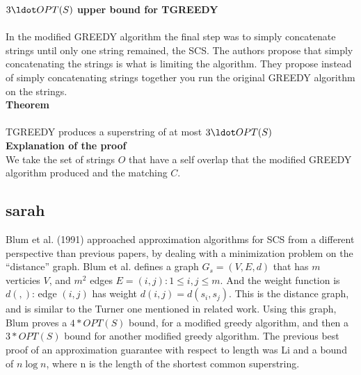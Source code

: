 \documentclass[letterpaper,11pt,titlepage]{article}
\begin{document}
\textbf{$3 \ldot OPT(S)$ upper bound for TGREEDY}\\\\

In the modified GREEDY algorithm the final step was to simply concatenate strings until only one string remained, the SCS. The authors propose that simply concatenating the strings is what is limiting the algorithm. They propose instead of simply concatenating strings together you run the original GREEDY algorithm on the strings. \\

\textbf{Theorem} \\\\
TGREEDY produces a superstring of at most $3 \ldot OPT(S)$\\

\textbf{Explanation of the proof}\\

We take the set of strings $O$ that have a self overlap that the modified GREEDY algorithm produced and the matching $C$. 


\subsection{sarah}

Blum et al. (1991) approached approximation algorithms for SCS from a different perspective than previous papers, by dealing with a minimization problem on the ``distance'' graph.  Blum et al. defines a graph $G_s = (V, E, d)$ that has $m$ verticies $V$, and $m^2$ edges $E = {(i,j): 1 \leq i, j \leq m}$.  And the weight function is $d(,)$: edge $(i,j)$ has weight $d(i,j) = d(s_i, s_j)$.  This is the distance graph, and is similar to the Turner one mentioned in related work.  Using this graph, Blum proves a $4*OPT(S)$ bound, for a modified greedy algorithm, and then a $3*OPT(S)$ bound for another modified greedy algorithm.  The previous best proof of an approximation guarantee with respect to length was Li and a bound of $n\log n$, where n is the length of the shortest common superstring.  

\newpage

{
  \small 
  
  
}
\end{document}
